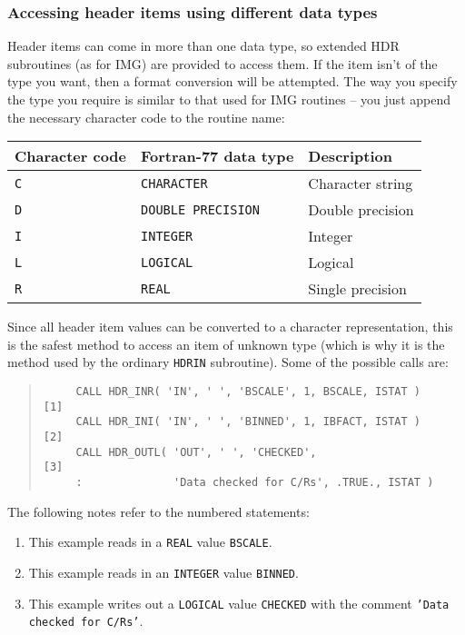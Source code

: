\documentclass[twoside,11pt]{article}
\newcommand{\htmlref}[2]{#1}
\renewcommand{\_}{\texttt{\symbol{95}}}
\newcommand{\myverb}[1]{{\texttt{#1}}}
\newcommand{\mynote}{The following notes refer to the numbered statements:}
\newenvironment{code}{\begin{small} \begin{quote}}
                     {\end{quote} \end{small}}
\newenvironment{enumnotes}
{
   \renewcommand{\labelenumi}{\myverb{[\theenumi]}}
   \begin{enumerate}
}{
   \end{enumerate}
   \renewcommand{\labelenumi}{\theenumi}
}
\renewenvironment{enumnotes}
  {
    \begin{enumerate}
  }{
    \end{enumerate}
  }
\begin{document}
\subsubsection{Accessing header items using different data types}
Header items can come in more than one data type, so extended HDR
subroutines (as for IMG) are provided to access them. If the item
isn't of the type you want, then a format conversion will be
attempted. The way you specify the type you require is similar to
that used for IMG routines -- you just append the necessary character
code to the routine name:
\begin{small}
\begin{center}
\begin{tabular}{||l|l|l||}
\hline
Character code & Fortran-77 data type      &  Description      \\
\hline
 \myverb{C}    & \myverb{CHARACTER}        &  Character string \\
 \myverb{D}    & \myverb{DOUBLE PRECISION} &  Double precision \\
 \myverb{I}    & \myverb{INTEGER}          &  Integer          \\
 \myverb{L}    & \myverb{LOGICAL}          &  Logical          \\
 \myverb{R}    & \myverb{REAL}             &  Single precision \\
\hline
\end{tabular}
\end{center}
\end{small}
Since all header item values can be converted to a character
representation, this is the safest method to access an item of unknown
type (which is why it is the method used by the ordinary
\htmlref{\myverb{HDR\_IN}}{HDR_INx} subroutine). Some of the possible calls are:
\begin{code}
\begin{verbatim}
     CALL HDR_INR( 'IN', ' ', 'BSCALE', 1, BSCALE, ISTAT )    [1]
     CALL HDR_INI( 'IN', ' ', 'BINNED', 1, IBFACT, ISTAT )    [2]
     CALL HDR_OUTL( 'OUT', ' ', 'CHECKED',                    [3]
     :              'Data checked for C/Rs', .TRUE., ISTAT )
\end{verbatim}
\end{code}
\mynote
\begin{enumnotes}
\item This example reads in a \myverb{REAL} value \myverb{BSCALE}.

\item This example reads in an \myverb{INTEGER} value \myverb{BINNED}.

\item This example writes out a \myverb{LOGICAL} value
\myverb{CHECKED} with the comment \myverb{'Data checked for C/Rs'}.
\end{enumnotes}
\end{document}
